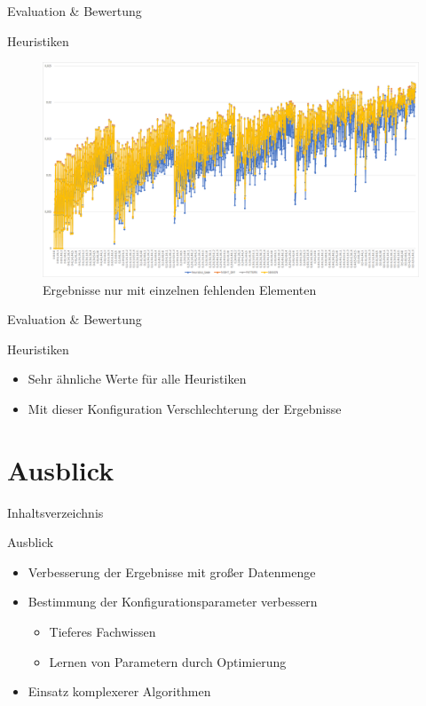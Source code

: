 \begin{frame}{Evaluation \& Bewertung}
\begin{block}{Heuristiken}
\begin{figure}
	\centering
	\includegraphics[width=1\textwidth]{pics/evaluation-heuristics.png}
	\caption{Ergebnisse nur mit einzelnen fehlenden Elementen}
\end{figure}
\end{block}
\end{frame}

\begin{frame}{Evaluation \& Bewertung}
\begin{block}{Heuristiken}
\begin{itemize}
	\item Sehr ähnliche Werte für alle Heuristiken
	\item Mit dieser Konfiguration Verschlechterung der Ergebnisse
\end{itemize}
\end{block}
\end{frame}

\section{Ausblick}
\begin{frame}{Inhaltsverzeichnis}
\tableofcontents[currentsection]
\end{frame}

\begin{frame}{Ausblick}
\begin{itemize}
	\item Verbesserung der Ergebnisse mit großer Datenmenge
	\item Bestimmung der Konfigurationsparameter verbessern
	\begin{itemize}
		\item Tieferes Fachwissen
		\item Lernen von Parametern durch Optimierung
	\end{itemize}
	\item Einsatz komplexerer Algorithmen
\end{itemize}
\end{frame}
